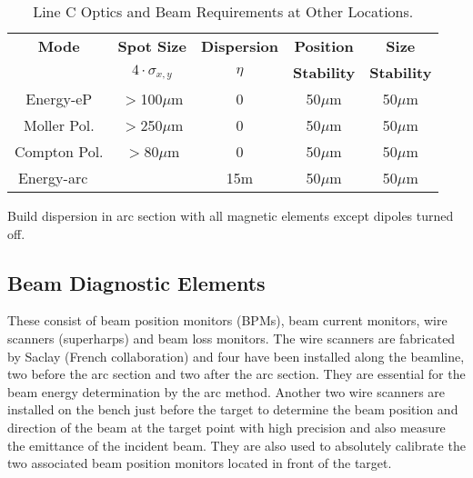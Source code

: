 {
\setcounter{footnotetmp1}{\value{footnote}}
\setcounter{footnotetmp2}{\value{footnotetmp1}}
\begin{table}[h]
\begin{center}
\begin{tabular}{|c|c|c|c|c|} \hline
{\bf Mode} & {\bf Spot Size} & {\bf Dispersion} & {\bf Position} & {\bf Size} \\
& {\bf $4\cdot{}\sigma_{x,y}$} & {\bf $\eta$} & {\bf Stability} & {\bf Stability} \\ \hline
Energy-eP  {\color{red}} & $>$100$\mu$m & 0 & 50$\mu$m & 50$\mu$m \\ \hline
Moller Pol.{\color{red}} & $>$250$\mu$m & 0 & 50$\mu$m & 50$\mu$m \\ \hline
Compton Pol.  & $>$80$\mu$m & 0 & 50$\mu$m & 50$\mu$m \\ \hline
Energy-arc {\color{red}~} && 15m & 50$\mu$m & 50$\mu$m \\ \hline
\end{tabular}
\end{center}
\caption[Beamline: Optics Requirements Other]{ Line C Optics and
         Beam Requirements at Other Locations.
}
\label{beam_tab4}
\end{table}
\addtocounter{footnote}{2}
\footnotetext[\value{footnotetmp1}]{Destructive measurements.}
\footnotetext[\value{footnotetmp2}]{Build dispersion in arc section with all 
             magnetic elements except dipoles turned off.}

Build dispersion in arc section with all magnetic elements except
dipoles turned off.

\subsection{Beam Diagnostic Elements}

These consist of beam position monitors (BPMs), beam current monitors,  wire 
scanners (superharps) and beam loss monitors. 
The wire scanners are fabricated by Saclay (French 
collaboration) and four have been installed along the beamline, two before 
the arc section and two after the arc section. They are essential for the 
beam energy determination by the arc method. Another two wire scanners are
installed on the bench just before the target to determine the beam 
position and direction of the beam at the target point with high precision 
and also measure the emittance of the incident beam. They are also used to  
absolutely calibrate the two associated beam position monitors located  in 
front of the target. 

}
